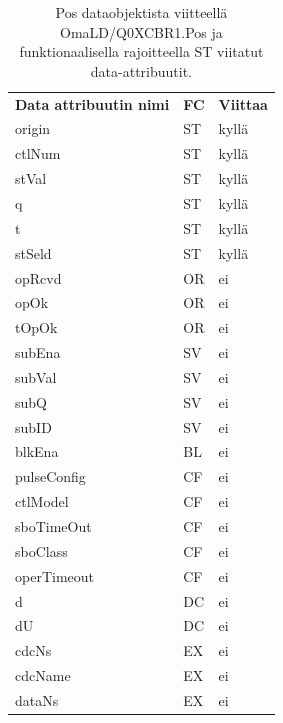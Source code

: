 \begin{table}[ht!]
	\caption{Pos dataobjektista viitteellä OmaLD/Q0XCBR1.Pos ja funktionaalisella rajoitteella ST viitatut data-attribuutit.}
	\label{tab:fc-usage-example}
	\begin{tabular}{l | l | l }
		\hline
		\textbf{Data attribuutin nimi} & \textbf{FC} & \textbf{Viittaa} \\
		origin & ST & kyllä \\
		ctlNum & ST & kyllä \\
		stVal & ST & kyllä \\
		q & ST & kyllä \\
		t & ST & kyllä \\
		stSeld & ST & kyllä \\
		opRcvd & OR & ei \\
		opOk & OR & ei \\
		tOpOk & OR & ei \\
		subEna & SV & ei \\
		subVal & SV & ei \\
		subQ & SV & ei \\
		subID & SV & ei \\
		blkEna & BL & ei \\
		pulseConfig & CF & ei \\
		ctlModel & CF & ei \\
		sboTimeOut & CF & ei \\
		sboClass & CF & ei \\
		operTimeout & CF & ei \\
		d & DC & ei \\
		dU & DC & ei \\
		cdcNs & EX & ei \\
		cdcName & EX & ei \\
		dataNs & EX & ei \\
		\hline
	\end{tabular}
\end{table}

